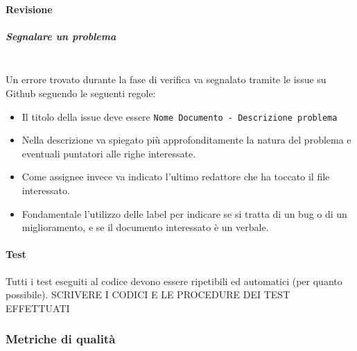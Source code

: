 \setlength\extrarowheight{0pt}

\paragraph{Revisione}
\subparagraph{Segnalare un problema}
\mbox{}\\
Un errore trovato durante la fase di verifica va segnalato tramite le issue su Github
seguendo le seguenti regole:
\begin{itemize}
    \item Il titolo della issue deve essere
    \texttt{Nome Documento - Descrizione problema}
    \item Nella descrizione va spiegato più approfonditamente la natura del
    problema e eventuali puntatori alle righe interessate.
    \item  Come assignee invece va indicato l'ultimo redattore che ha toccato il file
    interessato.
    \item Fondamentale l'utilizzo delle label per indicare se si tratta
    di un bug o di un miglioramento, e se il documento interessato è un verbale.
\end{itemize}

\paragraph{Test}
Tutti i test eseguiti al codice devono essere ripetibili ed automatici (per quanto possibile).
SCRIVERE I CODICI E LE PROCEDURE DEI TEST EFFETTUATI

\subsubsection{Metriche di qualità}

